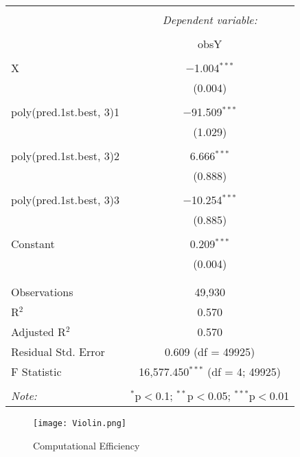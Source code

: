 \documentclass[12pt,english]{article}
\begin{document}
\begin{table}[!htbp] \centering
  \caption{}
  \label{}
\begin{tabular}{@{\extracolsep{5pt}}lc}
\\[-1.8ex]\hline
\hline \\[-1.8ex]
 & \multicolumn{1}{c}{\textit{Dependent variable:}} \\
\cline{2-2}
\\[-1.8ex] & obsY \\
\hline \\[-1.8ex]
 X & $-$1.004$^{***}$ \\
  & (0.004) \\
  & \\
 poly(pred.1st.best, 3)1 & $-$91.509$^{***}$ \\
  & (1.029) \\
  & \\
 poly(pred.1st.best, 3)2 & 6.666$^{***}$ \\
  & (0.888) \\
  & \\
 poly(pred.1st.best, 3)3 & $-$10.254$^{***}$ \\
  & (0.885) \\
  & \\
 Constant & 0.209$^{***}$ \\
  & (0.004) \\
  & \\
\hline \\[-1.8ex]
Observations & 49,930 \\
R$^{2}$ & 0.570 \\
Adjusted R$^{2}$ & 0.570 \\
Residual Std. Error & 0.609 (df = 49925) \\
F Statistic & 16,577.450$^{***}$ (df = 4; 49925) \\
\hline
\hline \\[-1.8ex]
\textit{Note:}  & \multicolumn{1}{r}{$^{*}$p$<$0.1; $^{**}$p$<$0.05; $^{***}$p$<$0.01} \\
\end{tabular}
\end{table}

\begin{figure}
  \texttt{[image: Violin.png]}
  \caption{Computational Efficiency}
  \label{fig:boat1}
\end{figure}
\end{document}
